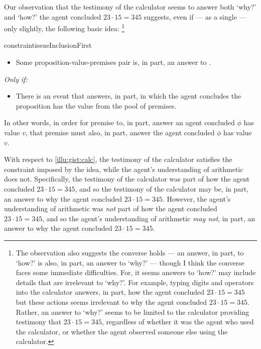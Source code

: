 \begin{note}
  Our observation that the testimony of the calculator seems to answer both `why?' and `how?' the agent concluded \(23 \cdot 15 = 345\) suggests, even if --- as a single  --- only slightly, the following basic idea:%
  \footnote{
    The observation also suggests the converse holds --- an answer, in part, to `how?' is also, in part, an answer to `why?' --- though I think the converse faces some immediate difficulties.
    For, it seems answers to `how?' may include details that are irrelevant to `why?'.
    For example, typing digits and operators into the calculator answers, in part, how the agent concluded \(23 \cdot 15 = 345\) but these actions seems irrelevant to why the agent concluded \(23 \cdot 15 = 345\).
    Rather, an answer to `why?' seems to be limited to the calculator providing testimony that \(23 \cdot 15 = 345\), regardless of whether it was the agent who used the calculator, or whether the agent observed someone else using the calculator.
  }

  \begin{restatable}[\issueInclusion{}]{constraint}{issueInclusionFirst}
    \label{issue:why-inc-in-how}
    \mbox{ }
    \vspace{-\baselineskip}
    \begin{itemize}
    \item
      Some proposition-value-premises pair is, in part, an answer to \qWhy{}.
    \end{itemize}
    \emph{Only if:}
    \begin{itemize}
    \item
      There is an event that answers, in part, \qHow{} in which the agent concludes the proposition has the value from the pool of premises.
    \end{itemize}
    \vspace{-\baselineskip}
  \end{restatable}

  In other words, in order for premise to, in part, answer \qWhy{} an agent concluded \(\phi\) has value \(v\), that premise must also, in part, answer \qHow{} the agent concluded \(\phi\) has value \(v\).

  With respect to \autoref{illu:gist:calc}, the testimony of the calculator satisfies the constraint imposed by the idea, while the agent's understanding of arithmetic does not.
  Specifically, the testimony of the calculator was part of how the agent concluded \(23 \cdot 15 = 345\), and so the testimony of the calculator may be, in part, an answer to why the agent concluded \(23 \cdot 15 = 345\).
  However, the agent's understanding of arithmetic was \emph{not} part of how the agent concluded \(23 \cdot 15 = 345\), and so the agent's understanding of arithmetic \emph{may not}, in part, an answer to why the agent concluded \(23 \cdot 15 = 345\).


\end{note}
